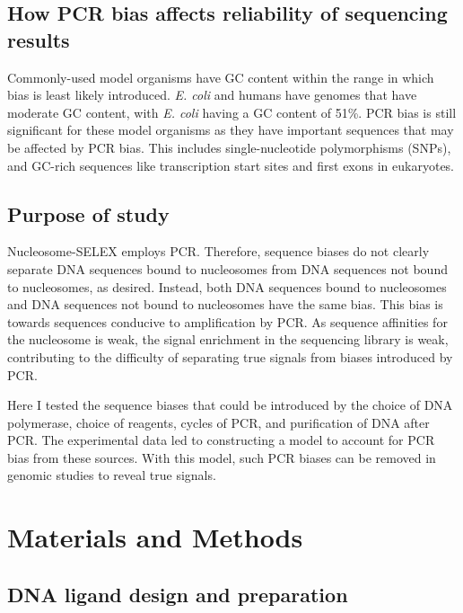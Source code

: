 \documentclass[parskip=full, numbers=noenddot]{scrreprt}
\begin{document}
\subsection{How PCR bias affects reliability of sequencing results}
\label{ssec:pcrbias_intro_effects}

Commonly-used model organisms have GC content within the range in which bias is least likely introduced.  \emph{E. coli} and humans have genomes that have moderate GC content, with \emph{E. coli} having a GC content of 51\%.  PCR bias is still significant for these model organisms as they have important sequences that may be affected by PCR bias.  This includes single-nucleotide polymorphisms (SNPs), and GC-rich sequences like transcription start sites and first exons in eukaryotes.  %

\subsection{Purpose of study}
\label{ssec:pcrbias_intro_why}

Nucleosome-SELEX employs PCR.  Therefore, sequence biases do not clearly separate DNA sequences bound to nucleosomes from DNA sequences not bound to nucleosomes, as desired.  Instead, both DNA sequences bound to nucleosomes and DNA sequences not bound to nucleosomes have the same bias.  This bias is towards sequences conducive to amplification by PCR.  As sequence affinities for the nucleosome is weak, the signal enrichment in the sequencing library is weak, contributing to the difficulty of separating true signals from biases introduced by PCR.

Here I tested the sequence biases that could be introduced by the choice of DNA polymerase, choice of reagents, cycles of PCR, and purification of DNA after PCR. The experimental data led to constructing a model to account for PCR bias from these sources.  With this model, such PCR biases can be removed in genomic studies to reveal true signals.

\section{Materials and Methods}
\label{sec:pcrbias_methods}

\subsection{DNA ligand design and preparation}
\label{ssec:pcrbias_methods_lig}
\end{document}
